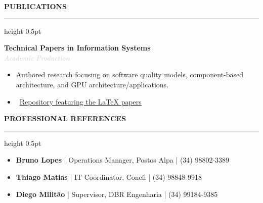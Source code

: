 \documentclass[10pt,a4paper]{article}
\newcommand{\cvsection}[1]{
    \vspace{12pt}
    {\large\textcolor{sectcol}{\textbf{\MakeUppercase{#1}}}}
    \vspace{2pt}
    \hrule height 0.5pt \relax
    \vspace{6pt}
}
\newcommand{\cvevent}[4]{
    \noindent \textbf{#2} \hfill \textcolor{sectcol}{\small \faCalendar* #1} \\
    \noindent \textit{\textcolor{lightgray}{#3}} \vspace{4pt} \\
    {#4} \vspace{8pt}
}
\begin{document}
\cvsection{Publications}
\cvevent{2021}{Technical Papers in Information Systems}{Academic Production}{
\begin{itemize}
    \item Authored research focusing on software quality models, component-based architecture, and GPU architecture/applications.
    \item \faGithub \ \href{https://github.com/GabMatheus/Pesquisas_Latex}{Repository featuring the LaTeX papers}
\end{itemize}
}

\cvsection{Professional References}
\begin{itemize}[label=\faUserCheck, leftmargin=1.5em]
    \item \textbf{Bruno Lopes} | Operations Manager, Postos Alpa | (34) 98802-3389
    \item \textbf{Thiago Matias} | IT Coordinator, Conefi | (34) 98848-9918
    \item \textbf{Diego Militão} | Supervisor, DBR Engenharia | (34) 99184-9385
\end{itemize}

\vfill
\center{\footnotesize \textcolor{lightgray}{Document generated in \LaTeX \ | Available for validation via GitHub.}}
\end{document}
